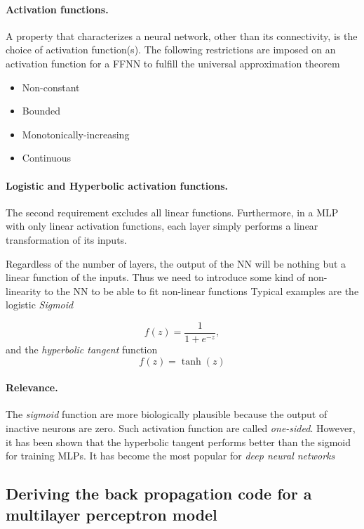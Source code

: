 \documentclass[%
oneside,                 %
final,                   %
10pt]{article}
\begin{document}
\paragraph{Activation functions.}
A property that characterizes a neural network, other than its
connectivity, is the choice of activation function(s).  The following restrictions are imposed on an activation function for a FFNN to fulfill the universal approximation theorem

\begin{itemize}
  \item Non-constant

  \item Bounded

  \item Monotonically-increasing

  \item Continuous
\end{itemize}

\noindent
\paragraph{Logistic and Hyperbolic activation functions.}
The second requirement excludes all linear functions. Furthermore, in
a MLP with only linear activation functions, each layer simply
performs a linear transformation of its inputs.

Regardless of the number of layers, the output of the NN will be
nothing but a linear function of the inputs. Thus we need to introduce
some kind of non-linearity to the NN to be able to fit non-linear
functions Typical examples are the logistic \emph{Sigmoid}

\[
 f(z) = \frac{1}{1 + e^{-z}},
\]
and the \emph{hyperbolic tangent} function
\[
 f(z) = \tanh(z)
\]

\paragraph{Relevance.}
The \emph{sigmoid} function are more biologically plausible because the
output of inactive neurons are zero. Such activation function are
called \emph{one-sided}. However, it has been shown that the hyperbolic
tangent performs better than the sigmoid for training MLPs. It has
become the most popular for \emph{deep neural networks}


\subsection{Deriving the back propagation code for a multilayer perceptron model}
\end{document}
